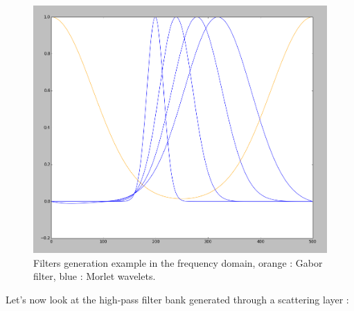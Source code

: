 \documentclass[a4paper]{report}
\begin{document}
\begin{figure}[H]
\begin{center}
\includegraphics[scale=0.21]{example1.png}\caption{Filters generation example in the frequency domain, orange : Gabor filter, blue : Morlet wavelets.}
\end{center}
\end{figure}
Let's now look at the high-pass filter bank generated through a scattering layer :
\end{document}
